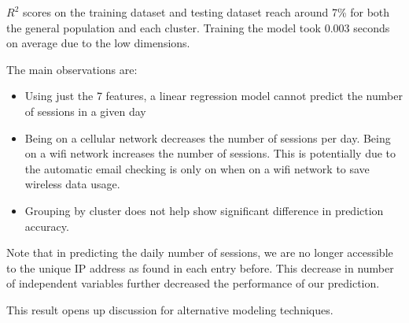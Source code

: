 \documentclass[]{article}
\newenvironment{Figure}
  {\par\medskip\noindent\minipage{\linewidth}}
  {\endminipage\par\medskip}
\begin{document}
$R^2$ scores on the training dataset and testing dataset reach around 7\% for both the general population and each cluster. Training the model took 0.003 seconds on average due to the low dimensions.

The main observations are:

\begin{itemize}
\item
Using just the 7 features, a linear regression model cannot predict the number of sessions in a given day
\item
Being on a cellular network decreases the number of sessions per day. Being on a wifi network increases the number of sessions. This is potentially due to the automatic email checking is only on when on a wifi network to save wireless data usage.
\item
Grouping by cluster does not help show significant difference in prediction accuracy. 
\end{itemize}

Note that in predicting the daily number of sessions, we are no longer accessible to the unique IP address as found in each entry before. This decrease in number of independent variables further decreased the performance of our prediction. 

This result opens up discussion for alternative modeling techniques.


%




\end{document}
